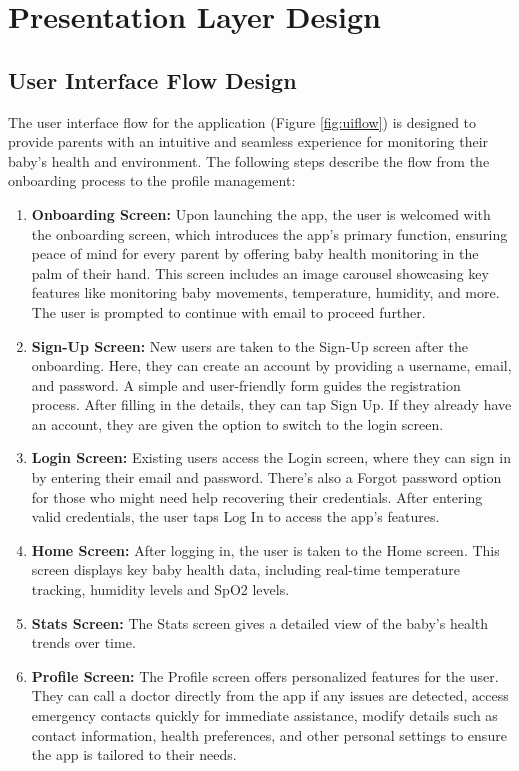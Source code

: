 \documentclass[12pt,a4paper]{report}
\begin{document}
\section{Presentation Layer Design}
\subsection{User Interface Flow Design}
The user interface flow for the application (Figure \ref{fig:uiflow}) is designed to provide parents with an intuitive and seamless experience for monitoring their baby's health and environment. The following steps describe the flow from the onboarding process to the profile management:
\begin{enumerate}
  \item \textbf{Onboarding Screen:} Upon launching the app, the user is welcomed with the onboarding screen, which introduces the app’s primary function, ensuring peace of mind for every parent by offering baby health monitoring in the palm of their hand. This screen includes an image carousel showcasing key features like monitoring baby movements, temperature, humidity, and more. The user is prompted to continue with email to proceed further.
  \item \textbf{Sign-Up Screen:} New users are taken to the Sign-Up screen after the onboarding. Here, they can create an account by providing a username, email, and password. A simple and user-friendly form guides the registration process. After filling in the details, they can tap Sign Up. If they already have an account, they are given the option to switch to the login screen.
  \item \textbf{Login Screen:} Existing users access the Login screen, where they can sign in by entering their email and password. There’s also a Forgot password option for those who might need help recovering their credentials. After entering valid credentials, the user taps Log In to access the app’s features.
  \item \textbf{Home Screen:} After logging in, the user is taken to the Home screen. This screen displays key baby health data, including real-time temperature tracking, humidity levels and SpO2 levels.
  \item \textbf{Stats Screen:} The Stats screen gives a detailed view of the baby’s health trends over time. 
  \item \textbf{Profile Screen:} The Profile screen offers personalized features for the user. They can call a doctor directly from the app if any issues are detected, access emergency contacts quickly for immediate assistance, modify details such as contact information, health preferences, and other personal settings to ensure the app is tailored to their needs.
\end{enumerate}
\end{document}
